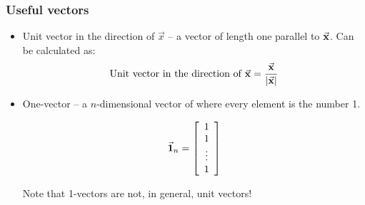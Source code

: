 \documentclass{beamer}
\begin{document}
\begin{frame}
  \frametitle{Useful vectors}

\begin{itemize}
  \item Unit vector in the direction of $\vec{x}$ -- a vector of length one parallel to $\vec{\mathbf{x}}$.  Can be calculated as:
    $$
    \text{Unit vector in the direction of } \vec{\mathbf{x}} = \frac{\vec{\mathbf{x}}}{|\vec{\mathbf{x}}|}
    $$
  
  \item {One-vector} -- a $n$-dimensional vector of where every element is the number 1.
  
  $$
  \vec{\mathbf{1}}_n = \left[
    \begin{array}{c}
    1 \\
    1 \\
    \vdots \\
    1 \\
    \end{array}
  \right]
  $$



  Note that 1-vectors are not, in general, unit vectors!



\end{itemize}

\end{frame}
\end{document}
